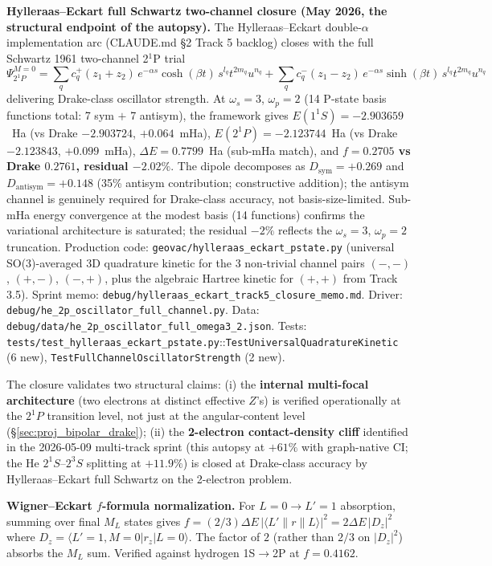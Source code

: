 \documentclass[11pt]{article}
\begin{document}
\textbf{Hylleraas--Eckart full Schwartz two-channel closure (May 2026,
the structural endpoint of the autopsy).}  The Hylleraas--Eckart double-$\alpha$
implementation arc (CLAUDE.md \S2 Track 5 backlog) closes with the full
Schwartz 1961 two-channel 2$^1$P trial
\[
\Psi_{2^1P}^{M=0} = \sum_q c_q^{+} (z_1+z_2)\,e^{-\alpha s}\cosh(\beta t)\,
                       s^{l_q} t^{2m_q} u^{n_q}
                 + \sum_q c_q^{-} (z_1-z_2)\,e^{-\alpha s}\sinh(\beta t)\,
                       s^{l_q} t^{2m_q} u^{n_q}
\]
delivering Drake-class oscillator strength.  At $\omega_s = 3$,
$\omega_p = 2$ (14 P-state basis functions total: 7 sym $+$ 7 antisym),
the framework gives $E(1^1\!S) = -2.903659$~Ha (vs Drake $-2.903724$,
$+0.064$~mHa), $E(2^1\!P) = -2.123744$~Ha (vs Drake $-2.123843$,
$+0.099$~mHa), $\Delta E = 0.7799$~Ha (sub-mHa match), and
\textbf{$f = 0.2705$ vs Drake $0.2761$, residual $\boxed{-2.02\%}$}.
The dipole decomposes as $D_\text{sym} = +0.269$ and
$D_\text{antisym} = +0.148$ (35\% antisym contribution; constructive
addition); the antisym channel is genuinely required for Drake-class
accuracy, not basis-size-limited.  Sub-mHa energy convergence at the
modest basis (14 functions) confirms the variational architecture is
saturated; the residual $-2\%$ reflects the $\omega_s = 3$, $\omega_p = 2$
truncation.  Production code: \texttt{geovac/hylleraas\_eckart\_pstate.py}
(universal SO(3)-averaged 3D quadrature kinetic for the 3 non-trivial
channel pairs $(-,-)$, $(+,-)$, $(-,+)$, plus the algebraic Hartree
kinetic for $(+,+)$ from Track 3.5).  Sprint memo:
\texttt{debug/hylleraas\_eckart\_track5\_closure\_memo.md}.  Driver:
\texttt{debug/he\_2p\_oscillator\_full\_channel.py}.  Data:
\texttt{debug/data/he\_2p\_oscillator\_full\_omega3\_2.json}.  Tests:
\texttt{tests/test\_hylleraas\_eckart\_pstate.py}::\texttt{TestUniversalQuadratureKinetic}
(6 new), \texttt{TestFullChannelOscillatorStrength} (2 new).

The closure validates two structural claims:
(i) the \textbf{internal multi-focal architecture} (two electrons at
distinct effective $Z$'s) is verified operationally at the $2^1P$
transition level, not just at the angular-content level (\S\ref{sec:proj_bipolar_drake});
(ii) the \textbf{2-electron contact-density cliff} identified in the
2026-05-09 multi-track sprint (this autopsy at $+61\%$ with graph-native
CI; the He $2^1S$--$2^3S$ splitting at $+11.9\%$) is closed at Drake-class
accuracy by Hylleraas--Eckart full Schwartz on the 2-electron problem.

\textbf{Wigner--Eckart $f$-formula normalization.}  For $L=0 \to L'=1$
absorption, summing over final $M_L$ states gives
$f = (2/3)\Delta E\,|\langle L'\|r\|L\rangle|^2 = 2\Delta E\,|D_z|^2$
where $D_z = \langle L'=1, M=0 | r_z | L=0\rangle$.  The factor of $2$
(rather than $2/3$ on $|D_z|^2$) absorbs the $M_L$ sum.  Verified
against hydrogen 1S$\to$2P at $f = 0.4162$.
\end{document}
